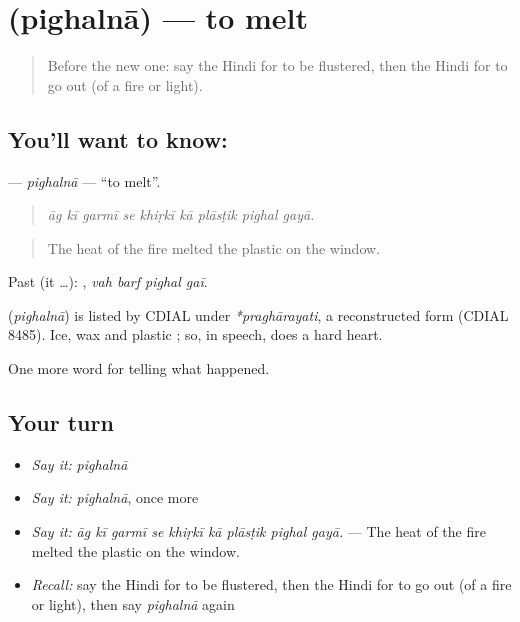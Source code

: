 \section[\texorpdfstring{\hi{पिघलना} (pighalnā)}{पिघलना (pighalnā)}]{ (pighalnā) — to melt}

\label{lesson:HI-C301-pighalna}



\begin{quote}
Before the new one: say the Hindi for to be flustered, then the Hindi for to go out (of a fire or light).
\end{quote}

\subsection*{You'll want to know: }
\textbf{} — \emph{pighalnā} — \textquotedblleft{}to melt\textquotedblright{}.

\begin{quote}
        
\end{quote}

\begin{quote}
\emph{āg kī garmī se khiṛkī kā plāsṭik pighal gayā.}
\end{quote}

\begin{quote}
The heat of the fire melted the plastic on the window.
\end{quote}

Past (it …):    , \emph{vah barf pighal gaī}.

\begin{cousinweb}
\textbf{} (\emph{pighalnā}) is listed by CDIAL under \emph{*praghārayati}, a reconstructed form (CDIAL 8485). Ice, wax and plastic \textbf{ }; so, in speech, does a hard heart.
\end{cousinweb}

\begin{grammarlens}[title={What you've built}]
One more word for telling what happened.
\end{grammarlens}

\subsection*{Your turn}
\begin{itemize}
\raggedright
  \item \emph{Say it:} \emph{pighalnā}
  \item \emph{Say it:} \emph{pighalnā}, once more
  \item \emph{Say it:} \emph{āg kī garmī se khiṛkī kā plāsṭik pighal gayā.} — The heat of the fire melted the plastic on the window.
  \item \emph{Recall:} say the Hindi for to be flustered, then the Hindi for to go out (of a fire or light), then say \emph{pighalnā} again
\end{itemize}

